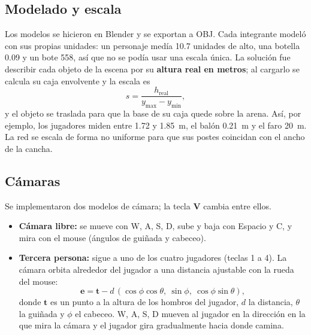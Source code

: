 \documentclass[12pt,letterpaper]{article}
\begin{document}
\subsection{Modelado y escala}
\label{sec:escala}
Los modelos se hicieron en Blender y se exportan a OBJ. Cada integrante modeló con sus
propias unidades: un personaje medía 10.7 unidades de alto, una botella 0.09 y un bote 558,
así que no se podía usar una escala única. La solución fue describir cada objeto de la escena
por su \textbf{altura real en metros}; al cargarlo se calcula su caja envolvente y la escala
es
\begin{equation}
  s = \frac{h_{\text{real}}}{y_{\max} - y_{\min}},
\end{equation}
y el objeto se traslada para que la base de su caja quede sobre la arena. Así, por ejemplo,
los jugadores miden entre 1.72 y 1.85~m, el balón 0.21~m y el faro 20~m. La red se escala de
forma no uniforme para que sus postes coincidan con el ancho de la cancha.

\subsection{Cámaras}
Se implementaron dos modelos de cámara; la tecla \textbf{V} cambia entre ellos.
\begin{itemize}
  \item \textbf{Cámara libre:} se mueve con W, A, S, D, sube y baja con Espacio y C, y mira con
        el mouse (ángulos de guiñada y cabeceo).
  \item \textbf{Tercera persona:} sigue a uno de los cuatro jugadores (teclas 1 a 4). La cámara
        orbita alrededor del jugador a una distancia ajustable con la rueda del mouse:
        \begin{equation}
          \mathbf{e} = \mathbf{t} - d\,(\cos\phi\cos\theta,\ \sin\phi,\ \cos\phi\sin\theta),
        \end{equation}
        donde $\mathbf{t}$ es un punto a la altura de los hombros del jugador, $d$ la
        distancia, $\theta$ la guiñada y $\phi$ el cabeceo. W, A, S, D mueven al jugador en la
        dirección en la que mira la cámara y el jugador gira gradualmente hacia donde camina.
\end{itemize}
\end{document}
